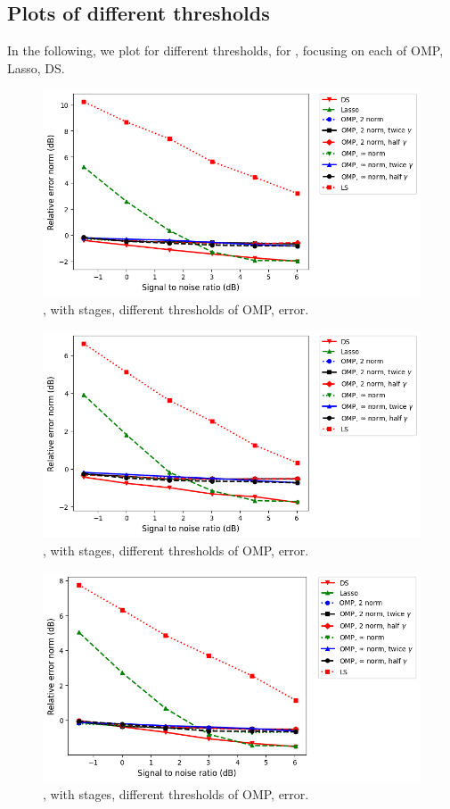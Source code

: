 \subsection {Plots of different thresholds}

In the following, we plot for different thresholds, for , focusing on each of OMP, Lasso, DS.
%
\begin {figure} [H]
\includegraphics [width = \textwidth] {error-medium-more-square-six-oommpp.png}
\caption {, with  stages, different thresholds of OMP, error.}
\end {figure}
%
\begin {figure} [H]
\includegraphics [width = \textwidth] {error-medium-more-wide-six-oommpp.png}
\caption {, with  stages, different thresholds of OMP, error.}
\end {figure}
%
\begin {figure} [H]
\includegraphics [width = \textwidth] {error-medium-more-tall-six-oommpp.png}
\caption {, with  stages, different thresholds of OMP, error.}
\end {figure}
